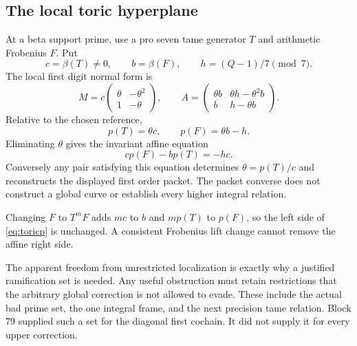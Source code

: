 \subsection{The local toric hyperplane}
At a beta support prime, use a pro seven tame generator $T$ and arithmetic Frobenius $F$. Put
\[
c=\beta(T)\ne0,\qquad b=\beta(F),\qquad h=(Q-1)/7\pmod7.
\]
The local first digit normal form is
\[
M=c\begin{pmatrix}\theta&-\theta^2\\1&-\theta\end{pmatrix},\qquad
A=\begin{pmatrix}\theta b&\theta h-\theta^2b\\b&h-\theta b\end{pmatrix}.
\]
Relative to the chosen reference,
\[
p(T)=\theta c,\qquad p(F)=\theta b-h.
\]
Eliminating $\theta$ gives the invariant affine equation
\begin{equation}\label{eq:toricp}
cp(F)-bp(T)=-hc.
\end{equation}
Conversely any pair satisfying this equation determines $\theta=p(T)/c$ and reconstructs the displayed first order packet. The packet converse does not construct a global curve or establish every higher integral relation.

Changing $F$ to $T^mF$ adds $mc$ to $b$ and $mp(T)$ to $p(F)$, so the left side of \eqref{eq:toricp} is unchanged. A consistent Frobenius lift change cannot remove the affine right side.

The apparent freedom from unrestricted localization is exactly why a justified ramification set is needed. Any useful obstruction must retain restrictions that the arbitrary global correction is not allowed to evade. These include the actual bad prime set, the one integral frame, and the next precision tame relation. Block 79 supplied such a set for the diagonal first cochain. It did not supply it for every upper correction.
